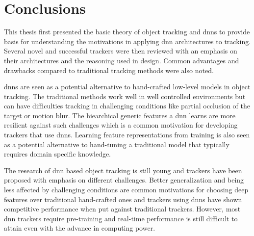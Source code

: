 \section{Conclusions}

This thesis first presented the basic theory of object tracking and \ac{dnn}s to provide basis for understanding the motivations in applying \ac{dnn} architectures to tracking. Several novel and successful trackers were then reviewed with an emphasis on their architectures and the reasoning used in design. Common advantages and drawbacks compared to traditional tracking methods were also noted.

\ac{dnn}s are seen as a potential alternative to hand-crafted low-level models in object tracking. The traditional methods work well in well controlled environments but can have difficulties tracking in challenging conditions like partial occlusion of the target or motion blur. The hiearchical generic features a \ac{dnn} learns are more resilient against such challenges which is a common motivation for developing trackers that use \ac{dnn}s. Learning feature representations from training is also seen as a potential alternative to hand-tuning a traditional model that typically requires domain specific knowledge.

The research of \ac{dnn} based object tracking is still young and trackers have been proposed with emphasis on different challenges. Better generalization and being less affected by challenging conditions are common motivations for choosing deep features over traditional hand-crafted ones and trackers using \ac{dnn}s have shown competitive performance when put against traditional trackers. However, most \ac{dnn} trackers require pre-training and real-time performance is still difficult to attain even with the advance in computing power.
